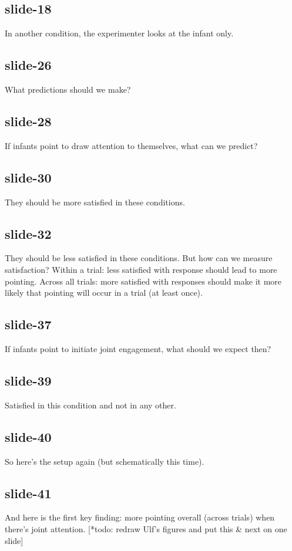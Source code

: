 \documentclass[12pt,\papersize]{extarticle}
\begin{document}
 
\subsection{slide-18}
In another condition, the experimenter looks at the infant only.
 
 
\subsection{slide-26}
What predictions should we make?
 
 
\subsection{slide-28}
If infants point to draw attention to themselves, what can we predict?
 
 
\subsection{slide-30}
They should be more satisfied in these conditions.
 
 
\subsection{slide-32}
They should be less satisfied in these conditions.
But how can we measure satisfaction?
Within a trial: less satisfied with response should lead to more pointing.
Across all trials: more satisfied with responses should make it more likely that pointing will occur in a trial (at least once).
 
 
\subsection{slide-37}
If infants point to initiate joint engagement, what should we expect then?
 
 
\subsection{slide-39}
Satisfied in this condition and not in any other.
 
 
\subsection{slide-40}
So here's the setup again (but schematically this time).
 
 
\subsection{slide-41}
And here is the first key finding: more pointing overall (across trials) when there's joint attention.
[*todo: redraw Ulf's figures and put this \& next on one slide]
 
\end{document}

